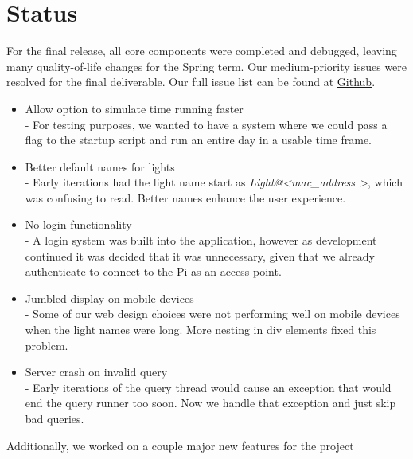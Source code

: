 \documentclass[10pt,draftclsnofoot,onecolumn]{IEEEtran}
\begin{document}
\section{Status}
For the final release, all core components were completed and debugged,
leaving many quality-of-life changes for the Spring term. Our medium-priority issues were resolved for the final
deliverable. Our full issue list can be
found at \href{https://github.com/rettigs/cs-senior-capstone/issues}{Github}.

\begin{itemize}
    \item Allow option to simulate time running faster\\
	  - For testing purposes, we wanted to have a system where
            we could pass a flag to the startup script and run an entire
            day in a usable time frame.
    \item Better default names for lights\\
          - Early iterations had the light name start as \textit{Light@\textless mac\_address \textgreater},
            which was confusing to read. Better names enhance the user experience.
    \item No login functionality\\
          - A login system was built into the application, however as development
            continued it was decided that it was unnecessary, given that we already
            authenticate to connect to the Pi as an access point.
    \item Jumbled display on mobile devices\\
          - Some of our web design choices were not performing well on mobile
            devices when the light names were long. More nesting in div elements
            fixed this problem.
    \item Server crash on invalid query\\
          - Early iterations of the query thread would cause an exception that would
            end the query runner too soon. Now we handle that exception and just skip
            bad queries.
\end{itemize}
Additionally, we worked on a couple major new features for the project
\end{document}
